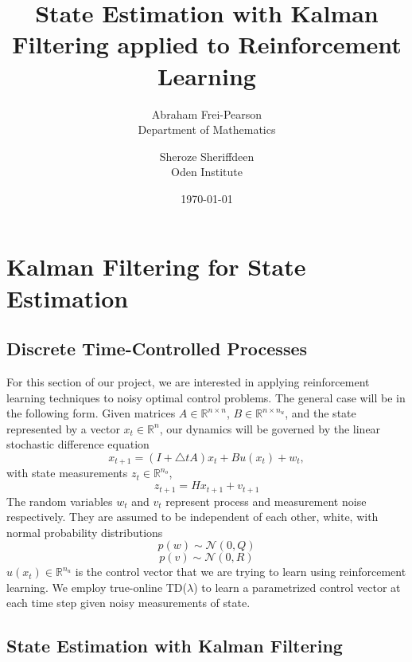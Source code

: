 \documentclass{article}
\title{State Estimation with Kalman Filtering applied to Reinforcement Learning}
\author{Abraham Frei-Pearson \\
	Department of Mathematics  \\
	\and 
	Sheroze Sheriffdeen \\
	Oden Institute \\
	}
\date{\today}
\begin{document}
\maketitle

\section{Kalman Filtering for State Estimation}
\subsection{Discrete Time-Controlled Processes}

For this section of our project, we are interested in applying reinforcement learning techniques to noisy optimal control problems. The general case will be in the following form. Given matrices $A \in \mathbb{R}^{n \times n}$, $B \in \mathbb{R}^{n \times n_u}$, and the state represented by a vector $x_t \in \mathbb R^n$, our dynamics will be governed by the linear stochastic difference equation
\begin{equation}
    x_{t+1} = (I + \triangle t A) x_t + Bu(x_t) + w_t,
    \label{eq:dynamical}
\end{equation}
with state measurements $z_t \in \mathbb{R}^{n_o}$, 
\[
	z_{t+1} = H x_{t+1} + v_{t+1}
\]
The random variables $w_t$ and $v_t$ represent process and measurement noise respectively. They are assumed to be independent of each other, white, with normal probability distributions
\[ 
p(w) \sim \mathcal{N}(0, Q)
\]
\[
p(v) \sim \mathcal{N}(0, R)
\]
$u(x_t) \in \mathbb{R}^{n_u}$ is the control vector that we are trying to learn using reinforcement learning. We employ true-online TD($\lambda$) to learn a parametrized control vector at each time step given noisy measurements of state.

\subsection{State Estimation with Kalman Filtering}
\end{document}
